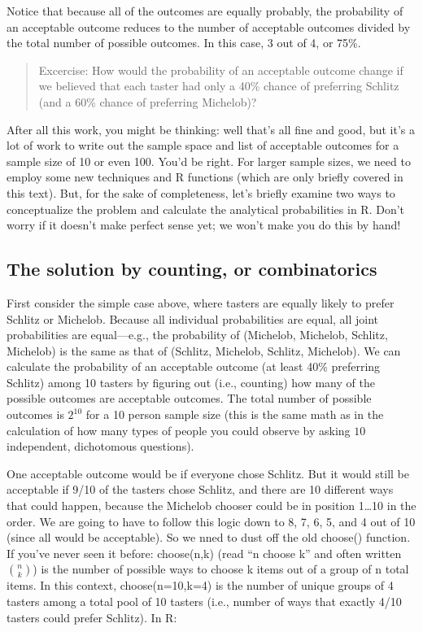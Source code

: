 \documentclass[openany]{book}
\begin{document}
Notice that because all of the outcomes are equally probably, the probability of an acceptable outcome reduces to the number of acceptable outcomes divided by the total number of possible outcomes. In this case, 3 out of 4, or 75\%.

\begin{quote}
Excercise: How would the probability of an acceptable outcome change if we believed that each taster had only a 40\% chance of preferring Schlitz (and a 60\% chance of preferring Michelob)?
\end{quote}

After all this work, you might be thinking: well that's all fine and good, but it's a lot of work to write out the sample space and list of acceptable outcomes for a sample size of 10 or even 100. You'd be right. For larger sample sizes, we need to employ some new techniques and R functions (which are only briefly covered in this text). But, for the sake of completeness, let's briefly examine two ways to conceptualize the problem and calculate the analytical probabilities in R. Don't worry if it doesn't make perfect sense yet; we won't make you do this by hand!

\hypertarget{the-solution-by-counting-or-combinatorics}{%
\subsection*{The solution by counting, or combinatorics}\label{the-solution-by-counting-or-combinatorics}}

First consider the simple case above, where tasters are equally likely to prefer Schlitz or Michelob. Because all individual probabilities are equal, all joint probabilities are equal---e.g., the probability of (Michelob, Michelob, Schlitz, Michelob) is the same as that of (Schlitz, Michelob, Schlitz, Michelob). We can calculate the probability of an acceptable outcome (at least 40\% preferring Schlitz) among 10 tasters by figuring out (i.e., counting) how many of the possible outcomes are acceptable outcomes. The total number of possible outcomes is \(2^{10}\) for a 10 person sample size (this is the same math as in the calculation of how many types of people you could observe by asking \(10\) independent, dichotomous questions).

One acceptable outcome would be if everyone chose Schlitz. But it would still be acceptable if 9/10 of the tasters chose Schlitz, and there are 10 different ways that could happen, because the Michelob chooser could be in position 1\ldots{}10 in the order. We are going to have to follow this logic down to 8, 7, 6, 5, and 4 out of 10 (since all would be acceptable). So we nned to dust off the old choose() function. If you've never seen it before: choose(n,k) (read ``n choose k'' and often written \(n\choose{k}\)) is the number of possible ways to choose k items out of a group of n total items. In this context, choose(n=10,k=4) is the number of unique groups of 4 tasters among a total pool of 10 tasters (i.e., number of ways that exactly 4/10 tasters could prefer Schlitz). In R:
\end{document}
